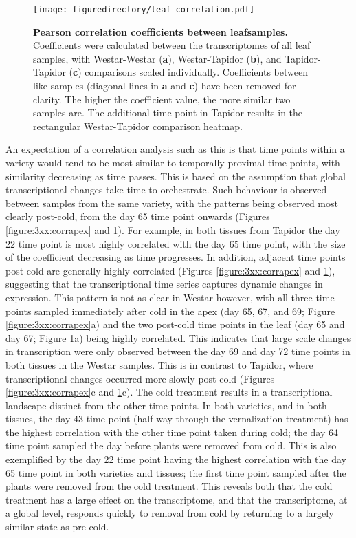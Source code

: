 \documentclass[12pt,]{book}
\begin{document}
\begin{figure}[htbp]
\centering
\texttt{[image: figuredirectory/leaf\_correlation.pdf]}
\caption{\textbf{Pearson correlation coefficients between leafsamples.}
Coefficients were calculated between the transcriptomes of all leaf
samples, with Westar-Westar (\textbf{a}), Westar-Tapidor (\textbf{b}),
and Tapidor-Tapidor (\textbf{c}) comparisons scaled individually.
Coefficients between like samples (diagonal lines in \textbf{a} and
\textbf{c}) have been removed for clarity. The higher the coefficient
value, the more similar two samples are. The additional time point in
Tapidor results in the rectangular Westar-Tapidor comparison
heatmap.}\label{figure:3xx:corrleaf}
\end{figure}

An expectation of a correlation analysis such as this is that time
points within a variety would tend to be most similar to temporally
proximal time points, with similarity decreasing as time passes. This is
based on the assumption that global transcriptional changes take time to
orchestrate. Such behaviour is observed between samples from the same
variety, with the patterns being observed most clearly post-cold, from
the day 65 time point onwards (Figures \ref{figure:3xx:corrapex} and
\ref{figure:3xx:corrleaf}). For example, in both tissues from Tapidor
the day 22 time point is most highly correlated with the day 65 time
point, with the size of the coefficient decreasing as time progresses.
In addition, adjacent time points post-cold are generally highly
correlated (Figures \ref{figure:3xx:corrapex} and
\ref{figure:3xx:corrleaf}), suggesting that the transcriptional time
series captures dynamic changes in expression. This pattern is not as
clear in Westar however, with all three time points sampled immediately
after cold in the apex (day 65, 67, and 69; Figure
\ref{figure:3xx:corrapex}a) and the two post-cold time points in the
leaf (day 65 and day 67; Figure \ref{figure:3xx:corrleaf}a) being highly
correlated. This indicates that large scale changes in transcription
were only observed between the day 69 and day 72 time points in both
tissues in the Westar samples. This is in contrast to Tapidor, where
transcriptional changes occurred more slowly post-cold (Figures
\ref{figure:3xx:corrapex}c and \ref{figure:3xx:corrleaf}c). The cold
treatment results in a transcriptional landscape distinct from the other
time points. In both varieties, and in both tissues, the day 43 time
point (half way through the vernalization treatment) has the highest
correlation with the other time point taken during cold; the day 64 time
point sampled the day before plants were removed from cold. This is also
exemplified by the day 22 time point having the highest correlation with
the day 65 time point in both varieties and tissues; the first time
point sampled after the plants were removed from the cold treatment.
This reveals both that the cold treatment has a large effect on the
transcriptome, and that the transcriptome, at a global level, responds
quickly to removal from cold by returning to a largely similar state as
pre-cold.
\end{document}
